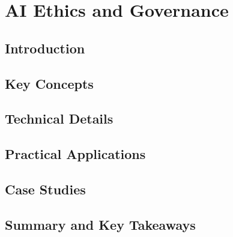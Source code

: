 ﻿%

\chapter{AI Ethics and Governance}
\label{ch:chapter-12}

\section{Introduction}


\section{Key Concepts}


\section{Technical Details}


\section{Practical Applications}


\section{Case Studies}


\section{Summary and Key Takeaways}


